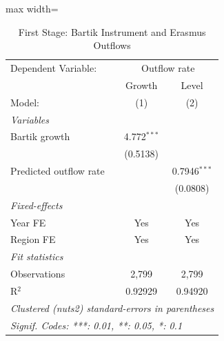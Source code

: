 \begin{table}[htbp]
   \caption{\label{tab:first_stage} First Stage: Bartik Instrument and Erasmus Outflows}
   \centering
   \scriptsize
   \begin{adjustbox}{max width=\textwidth}
   \begin{tabular}{lcc}
      \tabularnewline \midrule \midrule
      Dependent Variable: & \multicolumn{2}{c}{Outflow rate}\\
                             & Growth        & Level \\   
      Model:                 & (1)           & (2)\\  
      \midrule
      \emph{Variables}\\
      Bartik growth          & 4.772$^{***}$ &   \\   
                             & (0.5138)      &   \\   
      Predicted outflow rate &               & 0.7946$^{***}$\\   
                             &               & (0.0808)\\   
      \midrule
      \emph{Fixed-effects}\\
      Year FE                & Yes           & Yes\\  
      Region FE              & Yes           & Yes\\  
      \midrule
      \emph{Fit statistics}\\
      Observations           & 2,799         & 2,799\\  
      R$^2$                  & 0.92929       & 0.94920\\  
      \midrule \midrule
      \multicolumn{3}{p{\textwidth}}{\emph{Clustered (nuts2) standard-errors in parentheses}}\\
      \multicolumn{3}{p{\textwidth}}{\emph{Signif. Codes: ***: 0.01, **: 0.05, *: 0.1}}\\
   \end{tabular}
   \end{adjustbox}
\end{table}
